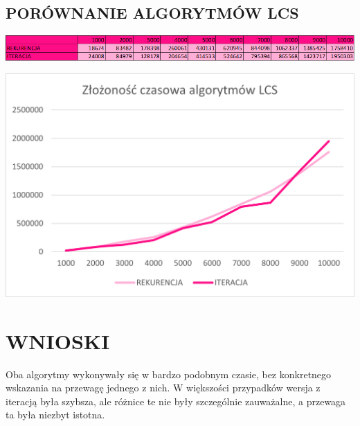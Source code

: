 \documentclass{article}
\begin{document}
\subsection*{PORÓWNANIE ALGORYTMÓW LCS}
\begin{center}
	\includegraphics[width = \textwidth]{Obraz6.png}
\end{center}
\begin{center}
	\includegraphics[width = \textwidth]{Obraz2.png}
\end{center}
\section*{WNIOSKI}
Oba algorytmy wykonywały się w bardzo podobnym czasie, bez konkretnego wskazania na przewagę jednego z nich. W większości przypadków wersja z iteracją była szybsza, ale różnice te nie były szczególnie zauważalne, a przewaga ta była niezbyt istotna.
\end{document}
